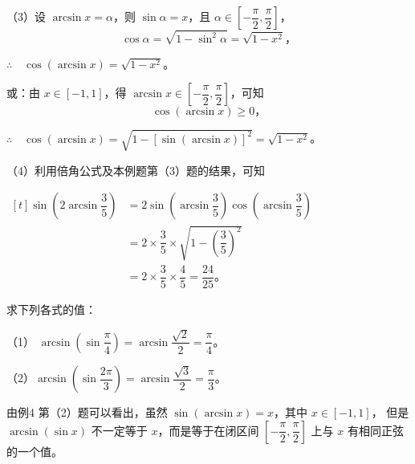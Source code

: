 （3）设 $\arcsin x = \alpha$，则 $\sin\alpha = x$，且 $\alpha \in \left[ -\dfrac{\pi}{2}, \dfrac{\pi}{2} \right]$，
$$\cos\alpha = \sqrt{1 - \sin^2\alpha} = \sqrt{1 - x^2} \text{，}$$

$\therefore \quad \cos(\arcsin x) = \sqrt{1 - x^2}$。

或：由 $x \in [-1, 1]$，得 $\arcsin x \in \left[ -\dfrac{\pi}{2}, \dfrac{\pi}{2} \right]$，可知
$$\cos(\arcsin x) \geqslant 0 \text{，}$$

$\therefore \quad \cos(\arcsin x) = \sqrt{1 - [\sin( \arcsin x )]^2} = \sqrt{1 - x^2}$。

（4）利用倍角公式及本例题第（3）题的结果，可知

\qquad $\begin{aligned}[t]
    \sin\left( 2\arcsin \dfrac{3}{5} \right) &= 2\sin\left( \arcsin \dfrac{3}{5} \right) \cos\left( \arcsin \dfrac{3}{5} \right) \\
    &= 2 \times \dfrac{3}{5} \times \sqrt{1 - \left( \dfrac{3}{5} \right)^2} \\
    &= 2 \times \dfrac{3}{5} \times \dfrac{4}{5} = \dfrac{24}{25} \text{。}
\end{aligned}$

\liti 求下列各式的值：
\begin{xiaoxiaotis}


\end{xiaoxiaotis}

\jie （1） $\arcsin\left( \sin\dfrac{\pi}{4} \right) = \arcsin\dfrac{\sqrt{2}}{2} = \dfrac{\pi}{4}$。

（2）$\arcsin\left( \sin\dfrac{2\pi}{3} \right) = \arcsin\dfrac{\sqrt{3}}{2} = \dfrac{\pi}{3}$。

由例4 第（2）题可以看出，虽然 $\sin(\arcsin x) = x$，其中 $x \in [-1, 1]$，
但是 $\arcsin(\sin x)$ 不一定等于 $x$，而是等于在闭区间
$\left[ -\dfrac{\pi}{2}, \dfrac{\pi}{2} \right]$
上与 $x$ 有相同正弦的一个值。

